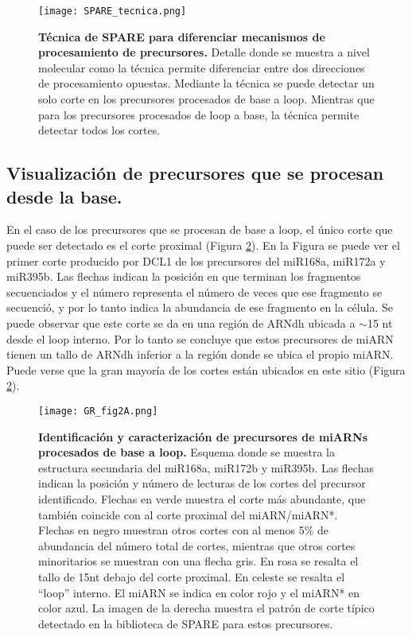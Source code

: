 \begin{figure}[htbp!] 
	\centering    
	\texttt{[image: SPARE\_tecnica.png]}
	\caption[Técnica de SPARE]{
        \textbf{Técnica de SPARE para diferenciar mecanismos de procesamiento de precursores.}
        Detalle donde se muestra a nivel molecular como la técnica permite diferenciar entre dos direcciones de procesamiento opuestas.
        Mediante la técnica se puede detectar un solo corte en los precursores procesados de base a loop.
        Mientras que para los precursores procesados de loop a base, la técnica permite detectar todos los cortes. 
    }
	 \label{fig:SPARE_tecnica}
\end{figure}

\subsection{Visualización de precursores que se procesan desde la base.}

En el caso de los precursores que se procesan de base a loop, el único corte que puede ser detectado es el corte proximal (Figura \ref{fig:GR_fig2A}).
En la Figura se puede ver el primer corte producido por DCL1 de los precursores del miR168a, miR172a y miR395b.
Las flechas indican la posición en que terminan los fragmentos secuenciados y el número representa el número de veces que ese fragmento se secuenció, y por lo tanto indica la abundancia de ese fragmento en la célula.
Se puede observar que este corte se da en una región de ARNdh ubicada a $\sim$15 nt desde el loop interno.
Por lo tanto se concluye que estos precursores de miARN tienen un tallo de ARNdh inferior a la región donde se ubica el propio miARN.
Puede verse que la gran mayoría de los cortes están ubicados en este sitio (Figura \ref{fig:GR_fig2A}).

\begin{figure}[htbp!] 
    \centering    
    \texttt{[image: GR\_fig2A.png]}
    \caption[Identificación y caracterización de precursores de miARNs procesados de base a loop]{
    \textbf{Identificación y caracterización de precursores de miARNs procesados de base a loop.}
            Esquema donde se muestra la estructura secundaria del miR168a, miR172b y miR395b.
            Las flechas indican la posición y número de lecturas de los cortes del precursor identificado.
            Flechas en verde muestra el corte más abundante, que también coincide con al corte proximal del miARN/miARN*.
            Flechas en negro muestran otros cortes con al menos 5\% de abundancia del número total de cortes, mientras que otros cortes minoritarios se muestran con una flecha gris.
            En rosa se resalta el tallo de 15nt debajo del corte proximal.
            En celeste se resalta el ``loop'' interno. 
            El miARN se indica en color rojo y el miARN* en color azul.
            La imagen de la derecha muestra el patrón de corte típico detectado en la biblioteca de SPARE para estos precursores.}
    \label{fig:GR_fig2A}
\end{figure}

